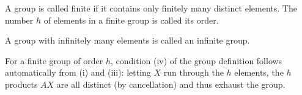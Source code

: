 A group is called finite if it contains only finitely many distinct elements. The number $h$ of elements in a finite group is called its order.

A group with infinitely many elements is called an infinite group.

For a finite group of order $h$, condition (iv) of the group definition follows automatically from (i) and (iii): letting $X$ run through the $h$ elements, the $h$ products $AX$ are all distinct (by cancellation) and thus exhaust the group.
